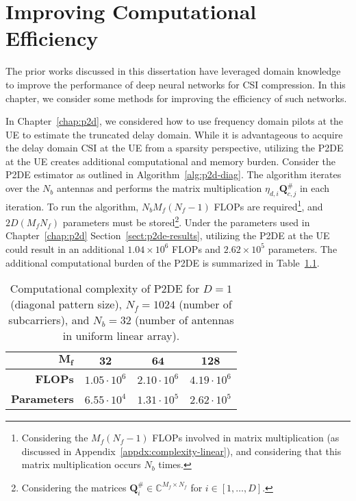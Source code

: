 \chapter{Improving Computational Efficiency} \label{chap:comp-effic}

The prior works discussed in this dissertation have leveraged domain knowledge to improve the performance of deep neural networks for CSI compression. In this chapter, we consider some methods for improving the efficiency of such networks.

In Chapter~\ref{chap:p2d}, we considered how to use frequency domain pilots at the UE to estimate the truncated delay domain. While it is advantageous to acquire the delay domain CSI at the UE from a sparsity perspective, utilizing the P2DE at the UE creates additional computational and memory burden. Consider the P2DE estimator as outlined in Algorithm~\ref{alg:p2d-diag}. The algorithm iterates over the $N_b$ antennas and performs the matrix multiplication $\eta_{d,i}\mathbf{Q}_{c,j}^{\#}$ in each iteration. To run the algorithm, $N_bM_f(N_f-1)$ FLOPs are required\footnote{Considering the $M_f(N_f-1)$ FLOPs involved in matrix multiplication (as discussed in Appendix~\ref{appdx:complexity-linear}), and considering that this matrix multiplication occurs $N_b$ times.}, and $2D(M_fN_f)$ parameters must be stored\footnote{Considering the matrices $\mathbf{Q}_i^{\#} \in \mathbb{C}^{M_f \times N_f}$ for $i \in [1, \dots, D]$.}. Under the parameters used in Chapter~\ref{chap:p2d} Section~\ref{sect:p2de-results}, utilizing the P2DE at the UE could result in an additional $1.04\times 10^{6}$ FLOPs and $2.62\times 10^{5}$ parameters. The additional computational burden of the P2DE is summarized in Table~\ref{tab:p2de-comp}. %

\begin{table}[!h]
\caption{Computational complexity of P2DE for $D=1$ (diagonal pattern size), $N_f=1024$ (number of subcarriers), and $N_b=32$ (number of antennas in uniform linear array).}
\begin{center}
\label{tab:p2de-comp} 
\begin{tabular}{|r|c|c|c|}
\hline
$\mathbf{M_f}$      & $\mathbf{32}$      & $\mathbf{64}$       & $\mathbf{128}$     \\ \hline
\textbf{FLOPs}      & $1.05\cdot 10^{6}$ & $2.10\cdot 10^{6}$  & $4.19\cdot 10^{6}$ \\ \hline
\textbf{Parameters} & $6.55\cdot 10^{4}$ & $1.31\cdot 10^{5}$  & $2.62\cdot 10^{5}$  \\ \hline
\end{tabular}
\end{center}
\vspace*{-0.3mm}
\end{table}

